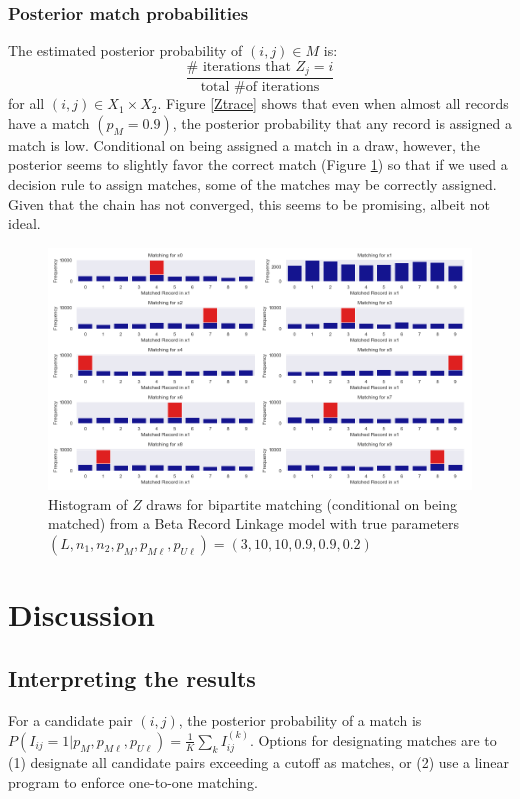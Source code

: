 \documentclass[11pt,reqno]{amsart}
\begin{document}
\subsubsection{Posterior match probabilities} 

The estimated posterior probability of $(i,j) \in M$ is:
$$ \frac{\# \text{ iterations that } Z_j = i}{\text{total \# of iterations}} $$
for all $(i,j)\in X_1\times X_2$.  Figure \ref{Ztrace} shows that even when almost all records have a match $(p_M = 0.9)$, the posterior probability that any record is assigned a match is low.  Conditional on being assigned a match in a draw, however, the posterior seems to slightly favor the correct match (Figure \ref{ZtraceCond}) so that if we used a decision rule to assign matches, some of the matches may be correctly assigned.  Given that the chain has not converged, this seems to be promising, albeit not ideal. 

\begin{figure}[h!]
\begin{center}
\includegraphics[width=\textwidth]{../Figures/bpm/nM9/ZmatchesnM9_L3_cond.png}
\caption{Histogram of $Z$ draws for bipartite matching (conditional on being matched) from a Beta Record Linkage model with true parameters $(L, n_1, n_2, p_M, p_{M\ell}, p_{U\ell}) = (3, 10, 10, 0.9, 0.9, 0.2)$ }
\label{ZtraceCond}
\end{center}
\end{figure}


\section{Discussion}

\subsection{Interpreting the results}  For a candidate pair $(i,j)$, the posterior probability of a match is $P(I_{ij}  = 1 | p_M, p_{M\ell}, p_{U\ell}) = \frac{1}{K}\sum_k I_{ij}^{(k)}$.  Options for designating matches are to (1) designate all candidate pairs exceeding a cutoff as matches, or (2) use a linear program to enforce one-to-one matching. 
\end{document}
